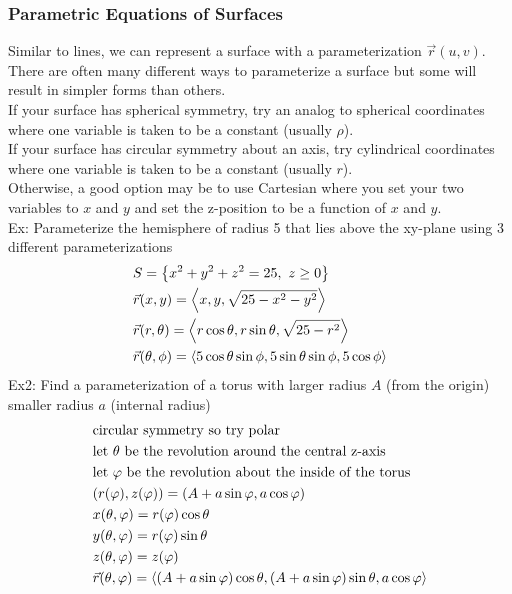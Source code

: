 \documentclass[11pt, fleqn]{article}
\begin{document}
\subsubsection{Parametric Equations of Surfaces}
Similar to lines, we can represent a surface with a parameterization $\vec{r}(u,v)$.\\
There are often many different ways to parameterize a surface but some will result in simpler forms than others.\\
If your surface has spherical symmetry, try an analog to spherical coordinates where one variable is taken to be a constant (usually $\rho$).\\
If your surface has circular symmetry about an axis, try cylindrical coordinates where one variable is taken to be a constant (usually $r$).\\
Otherwise, a good option may be to use Cartesian where you set your two variables to $x$ and $y$ and set the z-position to be a function of $x$ and $y$.\\
Ex: Parameterize the hemisphere of radius 5 that lies above the xy-plane using 3 different parameterizations
\begin{align*}
    &S=\left\{ x^2+y^2+z^2=25,\ z\geq0 \right\}\\
    &\vec{r}(x,y)=\left\langle x,y,\sqrt{25-x^2-y^2} \right\rangle\\
    &\vec{r}(r,\theta)=\left\langle r\cos\theta,r\sin\theta,\sqrt{25-r^2} \right\rangle\\
    &\vec{r}(\theta,\phi)=\left\langle 5\cos\theta\sin\phi,5\sin\theta\sin\phi,5\cos\phi \right\rangle
\end{align*}
Ex2: Find a parameterization of a torus with larger radius $A$ (from the origin) smaller radius $a$ (internal radius)
\begin{align*}
    &\text{circular symmetry so try polar}\\
    &\text{let $\theta$ be the revolution around the central z-axis}\\
    &\text{let $\varphi$ be the revolution about the inside of the torus}\\
    &(r(\varphi),z(\varphi))=(A+a\sin\varphi,a\cos\varphi)\\
    &x(\theta,\varphi)=r(\varphi)\cos\theta\\
    &y(\theta,\varphi)=r(\varphi)\sin\theta\\
    &z(\theta,\varphi)=z(\varphi)\\
    &\vec{r}(\theta,\varphi)=\left\langle (A+a\sin\varphi)\cos\theta,(A+a\sin\varphi)\sin\theta,a\cos\varphi \right\rangle
\end{align*}
\end{document}
